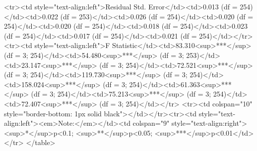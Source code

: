 <tr><td style="text-align:left">Residual Std. Error</td><td>0.013 (df = 254)</td><td>0.022 (df = 253)</td><td>0.026 (df = 254)</td><td>0.020 (df = 254)</td><td>0.020 (df = 254)</td><td>0.018 (df = 254)</td><td>0.023 (df = 254)</td><td>0.017 (df = 254)</td><td>0.021 (df = 254)</td></tr>
<tr><td style="text-align:left">F Statistic</td><td>83.310<sup>***</sup> (df = 3; 254)</td><td>54.480<sup>***</sup> (df = 3; 253)</td><td>23.147<sup>***</sup> (df = 3; 254)</td><td>72.521<sup>***</sup> (df = 3; 254)</td><td>119.730<sup>***</sup> (df = 3; 254)</td><td>158.024<sup>***</sup> (df = 3; 254)</td><td>61.363<sup>***</sup> (df = 3; 254)</td><td>75.213<sup>***</sup> (df = 3; 254)</td><td>72.407<sup>***</sup> (df = 3; 254)</td></tr>
<tr><td colspan="10" style="border-bottom: 1px solid black"></td></tr><tr><td style="text-align:left"><em>Note:</em></td><td colspan="9" style="text-align:right"><sup>*</sup>p<0.1; <sup>**</sup>p<0.05; <sup>***</sup>p<0.01</td></tr>
</table>

